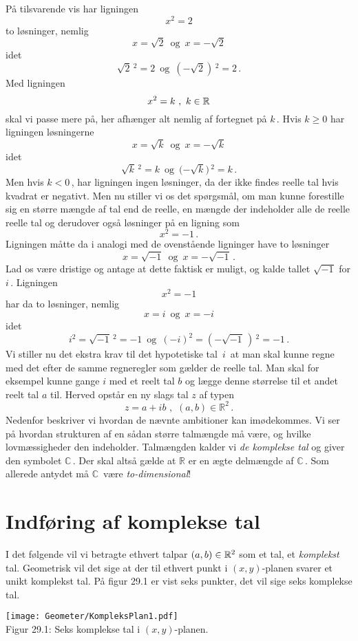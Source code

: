 På tilsvarende vis har ligningen
$$x^2=2$$
 to løsninger, nemlig
$$x=\sqrt 2\,\,\,\mathrm{og}\,\,\,x=-\sqrt 2$$
idet
$$\sqrt 2\,^2=2\,\,\,\mathrm{og}\,\,\,{(-\sqrt 2)}\,^2=2\,.$$
Med ligningen 
$$x^2=k\,\,,\,\,k\in\mathbb{R}$$
skal vi passe mere på, her afhænger alt nemlig af fortegnet på $k\,$. Hvis $k\geq 0$ har ligningen løsningerne 
$$x=\sqrt k\,\,\,\mathrm{og}\,\,\,x=-\sqrt k$$
idet
$$\sqrt k\,^2=k\,\,\,\mathrm{og}\,\,\,{(-\sqrt k})\,^2=k\,.$$
Men hvis $k<0\,$, har ligningen ingen løsninger, da der ikke findes reelle tal hvis kvadrat er negativt. \bs 
Men nu stiller vi os det spørgsmål, om man kunne forestille sig en større mængde af tal end de reelle, en mængde der indeholder alle de reelle reelle tal og derudover også løsninger på en ligning som 
$$x^2=-1\,.$$
Ligningen måtte da i analogi med de ovenstående ligninger have to løsninger
$$x=\sqrt{-1} \,\,\,\mathrm{og}\,\,\,x=-\sqrt{-1}\,.$$
Lad os være dristige og antage at dette faktisk er muligt, og kalde tallet $\sqrt{-1}$ for $i\,$. Ligningen
$$x^2=-1$$
har da to løsninger, nemlig
$$x=i\,\,\,\mathrm{og}\,\,\,x=-i$$
idet
$$i^2={\sqrt{-1}}\,^2=-1\,\,\,\mathrm{og}\,\,\,(-i)^2={(-\sqrt{-1}\,)}\,^2=-1\,.$$
Vi stiller nu det ekstra krav til det hypotetiske tal $\,i\,$ at man skal kunne regne med det efter de samme regneregler som gælder de reelle tal. Man skal for eksempel kunne gange $i$ med et reelt tal $b$ og lægge denne størrelse til et andet reelt tal $a$ til. Herved opstår en ny slags tal $z$ af typen 
$$z=a+ib\,\,,\,\,(a,b)\in \mathbb R^2\,.$$
Nedenfor beskriver vi hvordan de nævnte ambitioner kan imødekommes. Vi ser på hvordan strukturen af en sådan større talmængde må være, og hvilke lovmæssigheder den indeholder. Talmængden kalder vi \textit{de komplekse tal} og giver den symbolet $\mathbb C\,$. Der skal altså gælde at $\mathbb R$ er en ægte delmængde af $\mathbb C\,$. Som allerede antydet må $\mathbb C\,$ være \textit{to-dimensional}!

\section{Indføring af komplekse tal}

I det følgende vil vi betragte ethvert talpar $(a,b)\in \mathbb{R}^2$ som et tal, et \textit{komplekst} tal. Geometrisk vil det sige at der til ethvert punkt i $(x,y)$-planen svarer et unikt komplekst tal. På figur 29.1 er vist seks punkter, det vil sige seks komplekse tal. 

\begin{center}
	\texttt{[image: Geometer/KompleksPlan1.pdf]}\\
Figur 29.1: Seks komplekse tal i $(x,y)$-planen.		
\end{center}

